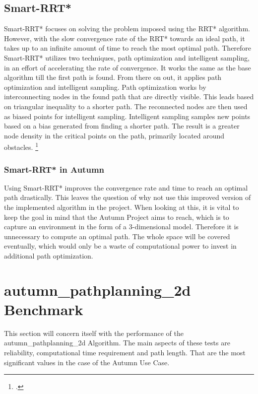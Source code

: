\subsection{Smart-RRT*}

Smart-RRT* focuses on solving the problem imposed using the RRT* algorithm. However, with the slow convergence rate of the RRT* towards an ideal path, it takes up to an infinite amount of time to reach the most optimal path. Therefore Smart-RRT* utilizes two techniques, path optimization and intelligent sampling, in an effort of accelerating the rate of convergence. 
It works the same as the base algorithm till the first path is found. From there on out, it applies path optimization and intelligent sampling. Path optimization works by interconnecting nodes in the found path that are directly visible. This leads based on triangular inequality to a shorter path. The reconnected nodes are then used as biased points for intelligent sampling. Intelligent sampling samples new points based on a bias generated from finding a shorter path. The result is a greater node density in the critical points on the path, primarily located around obstacles.  
\footcite{Islam2012}

\subsubsection{Smart-RRT* in Autumn}
Using Smart-RRT* improves the convergence rate and time to reach an optimal path drastically. This leaves the question of why not use this improved version of the implemented algorithm in the project. When looking at this, it is vital to keep the goal in mind that the Autumn Project aims to reach, which is to capture an environment in the form of a 3-dimensional model. Therefore it is unnecessary to compute an optimal path. The whole space will be covered eventually, which would only be a waste of computational power to invest in additional path optimization. 

\section{autumn\_pathplanning\_2d Benchmark}

This section will concern itself with the performance of the autumn\_pathplanning\_2d Algorithm. The main aspects of these tests are reliability, computational time requirement and path length. That are the most significant values in the case of the Autumn Use Case.

